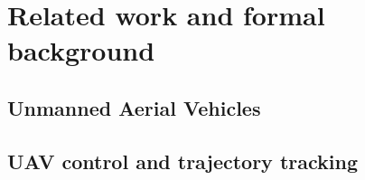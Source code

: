 \documentclass[a4paper,11pt,titlepage,twoside]{book}
\begin{document}

\section{Related work and formal background}

\subsection{Unmanned Aerial Vehicles}

\subsection{UAV control and trajectory tracking}
\end{document}
